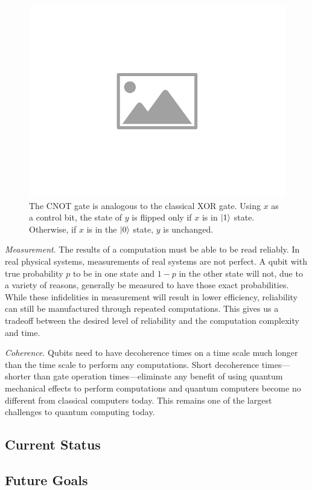 \begin{figure}[htbp]
    \centering
    \includegraphics[width=0.75\columnwidth]{placeholder-image}
    \caption{The CNOT gate is analogous to the classical XOR gate. Using $x$ as a control bit, the state of $y$ is flipped only if $x$ is in $\ket{1}$ state. Otherwise, if $x$ is in the $\ket{0}$ state, $y$ is unchanged.}
    \label{FIG:cnot_gate}
\end{figure}

\emph{Measurement}. The results of a computation must be able to be read reliably.
In real physical systems, measurements of real systems are not perfect. A qubit with true probability $p$ to be in one state and $1-p$ in the other state will not, due to a variety of reasons, generally be measured to have those exact probabilities.
While these infidelities in measurement will result in lower efficiency, reliability can still be manufactured through repeated computations.
This gives us a tradeoff between the desired level of reliability and the computation complexity and time.


\emph{Coherence}. Qubits need to have decoherence times on a time scale much longer than the time scale to perform any computations.
Short decoherence times---shorter than gate operation times---eliminate any benefit of using quantum mechanical effects to perform computations and quantum computers become no different from classical computers today.
This remains one of the largest challenges to quantum computing today.

\subsection{Current Status}
\subsection{Future Goals}